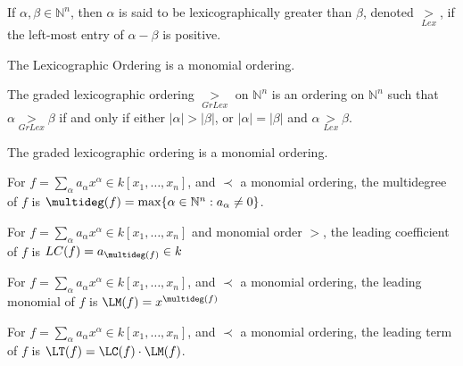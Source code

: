 \documentclass[crop=false,class=article,oneside]{standalone}
\begin{document}
            \begin{definition}
                If $\alpha,\beta \in \mathbb{N}^n$, then $\alpha$
                is said to be lexicographically greater than
                $\beta$, denoted $\underset{Lex}{>}$,
                if the left-most entry of
                $\alpha-\beta$ is positive.
            \end{definition}
            \begin{theorem}
                The Lexicographic Ordering
                is a monomial ordering.
            \end{theorem}
            \begin{definition}
                The graded lexicographic ordering
                $\underset{GrLex}{>}$ on $\mathbb{N}^n$ is an
                ordering on $\mathbb{N}^n$ such that
                $\alpha\underset{GrLex}{>}\beta$ if and only if
                either $|\alpha|>|\beta|$, or
                $|\alpha|=|\beta|$ and
                $\alpha\underset{Lex}{>}\beta$.
            \end{definition}
            \begin{theorem}
                The graded lexicographic
                ordering is a monomial ordering.
            \end{theorem}
            \begin{definition}
                For
                $f=\sum_{\alpha}%
                   a_{\alpha}x^{\alpha}\in{k}[x_{1},\hdots,x_{n}]$,
                and $\prec$ a monomial ordering,
                the multidegree of $f$ is
                $\multideg(f)%
                 =\max\{\alpha\in\mathbb{N}^n:a_{\alpha}\ne{0}\}$.
            \end{definition}
            \begin{definition}
                For
                $f=\sum_{\alpha}%
                   a_\alpha{x}^\alpha\in k[x_{1},\hdots,x_{n}]$
                and monomial order $>$, the leading
                coefficient of $f$ is
                $LC(f)=a_{\multideg(f)}\in{k}$
            \end{definition}
            \begin{definition}
                For
                $f=\sum_{\alpha}%
                   a_{\alpha}x^{\alpha}\in{k}[x_{1},\hdots,x_{n}]$,
                and $\prec$ a monomial ordering, the leading
                monomial of $f$ is $\LM(f)=x^{\multideg(f)}$
            \end{definition}
            \begin{definition}
                For
                $f=\sum_{\alpha}%
                   a_{\alpha}x^{\alpha}\in{k}[x_{1},\hdots,x_{n}]$,
                and $\prec$ a monomial ordering,
                the leading term of $f$ is
                $\LT(f)=\LC(f)\cdot\LM(f)$.
            \end{definition}
\end{document}

